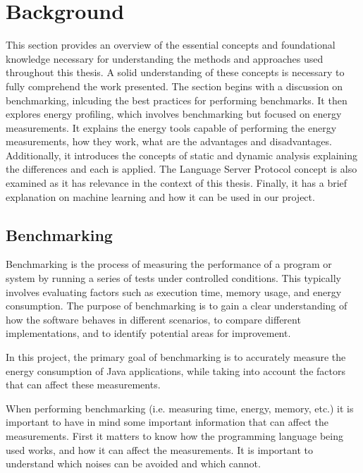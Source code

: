 \chapter{Background}\label{chapter:background}

This section provides an overview of the essential concepts and foundational knowledge necessary for understanding the methods and approaches used throughout this thesis. A solid understanding of these concepts is necessary to fully comprehend the work presented. {\color{blue}The section begins with a discussion on benchmarking, inlcuding the best practices for performing benchmarks. It then explores energy profiling, which involves benchmarking but focused on energy measurements. It explains the energy tools capable of performing the energy measurements, how they work, what are the advantages and disadvantages. Additionally, it introduces the concepts of static and dynamic analysis explaining the differences and each is applied. The Language Server Protocol concept is also examined as it has relevance in the context of this thesis. Finally, it has a brief explanation on machine learning and how it can be used in our project.}


\section{Benchmarking} \label{sec:background_benchmarking}

Benchmarking is the process of measuring the performance of a program or system by running a series of tests under controlled conditions. This typically involves evaluating factors such as execution time, memory usage, and energy consumption. The purpose of benchmarking is to gain a clear understanding of how the software behaves in different scenarios, to compare different implementations, and to identify potential areas for improvement.

In this project, the primary goal of benchmarking is to accurately measure the energy consumption of Java applications, while taking into account the factors that can affect these measurements. 

When performing benchmarking (i.e. measuring time, energy, memory, etc.) it is important to have in mind some important information that can affect the measurements. First it matters to know how the programming language being used works, and how it can affect the measurements. It is important to understand which noises can be avoided and which cannot.

